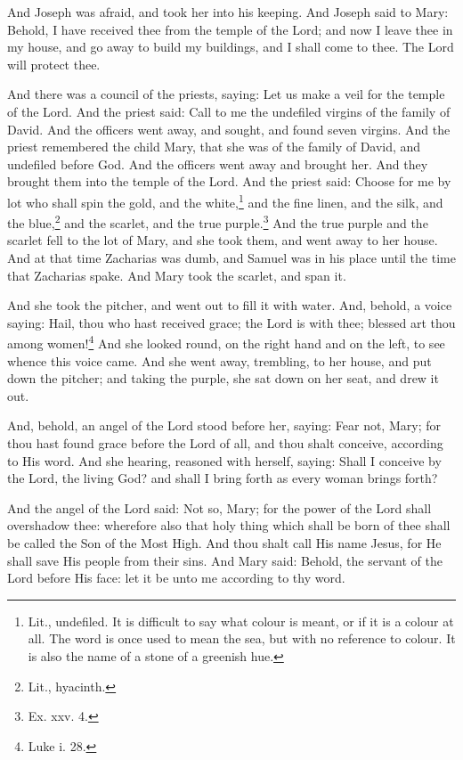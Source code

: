 \pend\pstart
And Joseph was afraid, and took her into his keeping. And Joseph said to Mary: Behold, I have received thee from the temple of the Lord; and now I leave thee in my house, and go away to build my buildings, and I shall come to thee. The Lord will protect thee.

\pend\pstart
{}

\pend\pstart
And there was a council of the priests, saying: Let us make a veil for the temple of the Lord. And the priest said: Call to me the undefiled virgins of the family of David. And the officers went away, and sought, and found seven virgins. And the priest remembered the child Mary, that she was of the family of David, and undefiled before God. And the officers went away and brought her. And they brought them into the temple of the Lord. And the priest said: Choose for me by lot who shall spin the gold, and the white,\footnote{Lit., undefiled. It is difficult to say what colour is meant, or if it is a colour at all. The word is once used to mean the sea, but with no reference to colour. It is also the name of a stone of a greenish hue.} and the fine linen, and the silk, and the blue,\footnote{Lit., hyacinth.} and the scarlet, and the true purple.\footnote{Ex. xxv. 4.} And the true purple and the scarlet fell to the lot of Mary, and she took them, and went away to her house. And at that time Zacharias was dumb, and Samuel was in his place until the time that Zacharias spake. And Mary took the scarlet, and span it.

\pend\pstart
{}

\pend\pstart
And she took the pitcher, and went out to fill it with water. And, behold, a voice saying: Hail, thou who hast received grace; the Lord is with thee; blessed art thou among women!\footnote{Luke i. 28.} And she looked round, on the right hand and on the left, to see whence this voice came. And she went away, trembling, to her house, and put down the pitcher; and taking the purple, she sat down on her seat, and drew it out.

\pend\pstart
And, behold, an angel of the Lord stood before her, saying: Fear not, Mary; for thou hast found grace before the Lord of all, and thou shalt conceive, according to His word. And she hearing, reasoned with herself, saying: Shall I conceive by the Lord, the living God? and shall I bring forth as every woman brings forth?

\pend\pstart
And the angel of the Lord said: Not so, Mary; for the power of the Lord shall overshadow thee: wherefore also that holy thing which shall be born of thee shall be called the Son of the Most High. And thou shalt call His name Jesus, for He shall save His people from their sins. And Mary said: Behold, the servant of the Lord before His face: let it be unto me according to thy word.

